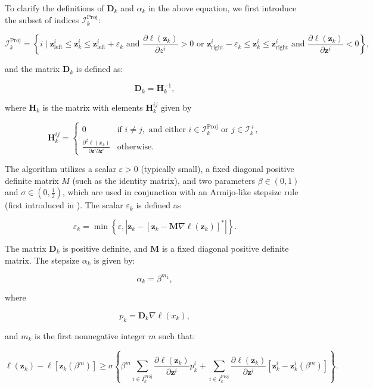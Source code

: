 \documentclass{article}
\theoremstyle{plain}
\theoremstyle{definition}
\def \H {\mathbf{H}}
\def \M {\mathbf{M}}
\def \sI {\mathcal{I}}
\def \M {\mathbf{M}}
\def \H {\mathbf{H}}
\def \H {\mathbf{H}}
\def \D {\mathbf{D}}
\def \z {\mathbf{z}}
\begin{document}
To clarify the definitions of \( \D_k \) and \(\alpha_k\) in the above equation, we first introduce the subset of indices \( \sI_k^{\operatorname{Proj}} \):

\[
    \sI_k^{\operatorname{Proj}} = \left\{ i \mid \z_{\operatorname{left}}^i \leq \z_k^i \leq \z_{\operatorname{left}}^i + \varepsilon_k \text{ and } \frac{\partial \ell\left(\z_k\right)}{\partial z^i} > 0 \text{ or } \z_{\operatorname{right}}^i - \varepsilon_k \leq \z_k^i \leq \z_{\operatorname{right}}^i \text{ and } \frac{\partial \ell\left(\z_k\right)}{\partial \z^i} < 0 \right\},
\]

and the matrix \( \D_k \) is defined as:

\[
    \D_k = \H_k^{-1},
\]

where \( \H_k \) is the matrix with elements \( \H_k^{ij} \) given by

\[
    \H_k^{ij} = 
    \begin{cases} 
      0 & \text{if } i \neq j, \text{ and either } i \in \sI_k^{\operatorname{Proj}} \text{ or } j \in \sI_k^{+}, \\
      \frac{\partial^2 \ell\left(x_k\right)}{\partial \z^i \partial \z^i} & \text{otherwise.}
    \end{cases}
\]

The algorithm utilizes a scalar \( \varepsilon > 0 \) (typically small), a fixed diagonal positive definite matrix \( M \) (such as the identity matrix), and two parameters \( \beta \in (0,1) \) and \( \sigma \in \left(0, \frac{1}{2}\right) \), which are used in conjunction with an Armijo-like stepsize rule (first introduced in \citep{bertsekas1976goldstein}). The scalar \( \varepsilon_k \) is defined as

\[
    \varepsilon_k = \min \left\{ \varepsilon, \left| \z_k - \left[ \z_k - \M \nabla \ell\left(\z_k\right) \right]^* \right| \right\}.
\]

The matrix \( \D_k \) is positive definite, and \( \M \) is a fixed diagonal positive definite matrix. The stepsize \( \alpha_k \) is given by:

\[
    \alpha_k = \beta^{m_k},
\]

where

\[
    p_k = \D_k \nabla \ell\left(x_k\right),
\]

and \( m_k \) is the first nonnegative integer \( m \) such that: 

\begin{equation}
    \label{Eq:Armijo}
    \ell\left(\z_k\right) - \ell\left[\z_k\left(\beta^m\right)\right] \geq \sigma \left\{ \beta^m \sum_{i \in I_k^{\operatorname{Proj}}} \frac{\partial \ell\left(\z_k\right)}{\partial \z^i} p_k^i + \sum_{i \in I_k^{\operatorname{Proj}}} \frac{\partial \ell\left(\z_k\right)}{\partial \z^i} \left[ \z_k^i - \z_k^i\left(\beta^m\right) \right] \right\}.
\end{equation}
\end{document}
